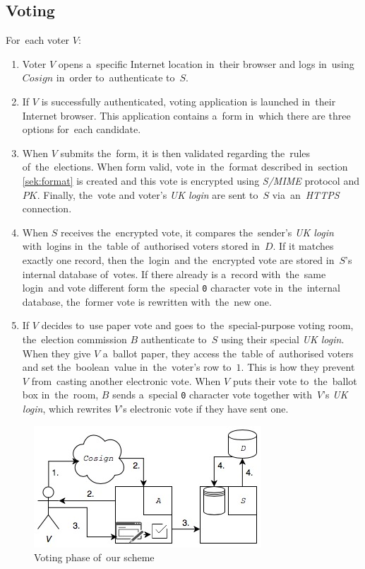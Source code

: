 \subsection{Voting}
For~each voter $V$:
\begin{enumerate}
\item Voter $V$ opens a~specific Internet location in~their browser and logs in~using $Cosign$ in~order to~authenticate to~$S$.
\item If $V$ is successfully authenticated, voting application is launched in~their Internet browser. This application contains a~form in~which there are three options for~each candidate.
\item When $V$ submits the~form, it is then validated regarding the~rules of~the~elections. When form valid, vote in~the~format described in~section \ref{sek:format} is created and this vote is encrypted using \emph{S/MIME} protocol and $PK$. Finally, the~vote and voter's \emph{UK login} are sent to~$S$ via~an~\emph{HTTPS} connection.
\item When $S$ receives the~encrypted vote, it compares the~sender's \emph{UK login} with~logins in~the~table of~authorised voters stored in~$D$. If it matches exactly one record, then the~login~and the~encrypted vote are stored in~$S$'s internal database of~votes. If there already is a~record with~the~same login~and vote different form the~special \texttt{0} character vote in~the~internal database, the~former vote is rewritten with~the~new one.
\item If $V$ decides to~use paper vote and goes to~the~special-purpose voting room, the~election commission $B$ authenticate to~$S$ using their special \emph{UK login}. When they give $V$ a~ballot paper, they access the~table of~authorised voters and set the~boolean~value in~the~voter's row to~$1$. This is how they prevent $V$ from~casting another electronic vote. When $V$ puts their vote to~the~ballot box in~the~room, $B$ sends a~special \texttt{0} character vote together with~$V$'s \emph{UK login}, which rewrites $V$'s electronic vote if they have sent one.
\end{enumerate}

\begin{figure}
\begin{center}
\includegraphics[scale=0.9]{images/Voting1}
\caption{Voting phase of~our scheme}
\end{center}
\end{figure}

